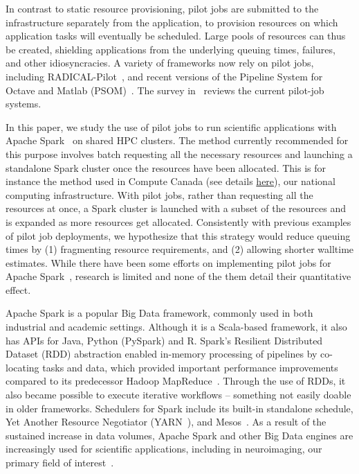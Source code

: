 \documentclass{IEEEtran}
\begin{document}
In contrast to static resource provisioning, pilot jobs are submitted to
the infrastructure separately from the application, to provision resources
on which application tasks will eventually be scheduled. Large pools of
resources can thus be created, shielding applications from the underlying
queuing times, failures, and other idiosyncracies. A variety of frameworks
now rely on pilot jobs, including RADICAL-Pilot~\cite{merzky2015radical},
and recent versions of the Pipeline System for Octave and Matlab
(PSOM)~\cite{bellec2012pipeline}. The survey in~\cite{turilli2018comprehensive} reviews
the current pilot-job systems.

In this paper, we study the use of pilot jobs to run scientific
applications with Apache Spark~\cite{zaharia2016apache} on shared HPC
clusters. The method currently recommended for this purpose involves batch
requesting all the
necessary resources and launching a standalone Spark cluster once the
resources have been allocated. This is for instance the method used in
Compute Canada (see details \href{https://docs.computecanada.ca/wiki/Apache_Spark/en}{here}),
 our national computing infrastructure. With pilot
jobs, rather than requesting all the resources at once, a Spark cluster is
launched with a subset of the resources and is expanded as more resources
get allocated. Consistently with previous examples of pilot job
deployments, we hypothesize that this strategy would reduce queuing times
by (1) fragmenting resource requirements, and (2) allowing shorter walltime
estimates. While there have been some efforts on implementing pilot jobs
for Apache Spark~\cite{jha-spark-pbs}, research is limited and
none of the them detail their quantitative effect.

Apache Spark is a popular Big Data framework, commonly used in both
industrial and academic settings. Although it is a Scala-based framework,
it also has APIs for Java, Python (PySpark) and R. Spark's Resilient
Distributed Dataset (RDD) abstraction enabled in-memory processing of
pipelines by co-locating tasks and data, which provided important
performance improvements compared to its predecessor Hadoop
MapReduce~\cite{dean2008mapreduce}. Through the use of RDDs, it also became possible
to execute iterative workflows -- something not easily doable in older
frameworks. Schedulers for Spark include its built-in standalone schedule,
Yet Another Resource Negotiator (YARN~\cite{apache13yet}), and Mesos~\cite{hindman2011mesos}. As a
result of the sustained increase in data volumes, Apache Spark and other
Big Data engines are increasingly used for scientific applications,
including in neuroimaging, our primary field of
interest~\cite{boubela2016big,mehta2017comparative,maybethesimulationone,freeman2014mapping}.
\end{document}
